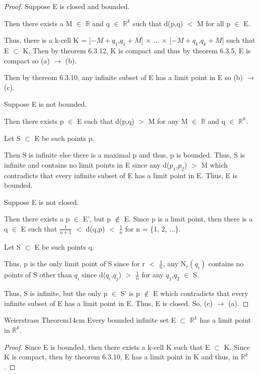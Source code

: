 	\begin{proof}
		Suppose E is closed and bounded.

		Then there exists a M $\in$ $\mathbb{R}$ and q $\in$ $\mathbb{R}^k$
		such that d(p,q) $<$ M for all p $\in$ E.
		
		Thus, there is a k-cell
		K = [$-M+q_1$,$q_1+M$] $\times$ ... $\times$ [$-M+q_k$,$q_k+M$]
		such that E $\subset$ K.
		Then by {\color{red} theorem 6.3.12}, K is compact
		and thus by {\color{red} theorem 6.3.5}, E is compact
		so (a) $\rightarrow$ (b).

		Then by {\color{red} thereom 6.3.10}, any infinite subset
		of E has a limit point in E so (b) $\rightarrow$ (c).

		Suppose E is not bounded.

		Then there exists p $\in$ E such that d(p,q) $>$ M for
		any M $\in$ $\mathbb{R}$ and q $\in$ $\mathbb{R}^k$.

		Let S $\subset$ E be such points p.
		
		Then S is infinite else there is a maximal p and thus,
		p is bounded.
		Thus, S is infinite and contains no limit points in E
		since any d($p_1$,$p_2$) $>$ M which contradicts that
		every infinite subset of E has a limit point in E.
		Thus, E is bounded.

		Suppose E is not closed.

		Then there exists a p $\in$ E', but p $\not \in$ E.
		Since p is a limit point, then there is a
		q $\in$ E such that $\frac{1}{n+1}$ $<$ d(q,p) $<$ $\frac{1}{n}$
		for n = \{1, 2, ...\}.

		Let S $\subset$ E be such points q.

		Thus, p is the only limit point of S since for r $<$ $\frac{1}{n}$,
		any N$_r(q_i)$ contains no points of S other than $q_i$ since
		d($q_i$,$q_j$) $>$ $\frac{1}{n}$ for any $q_1$,$q_2$ $\in$ S.
		
		Thus, S is infinite, but the only p $\in$ S' is p $\not \in$ E
		which contradicts that every infinite subset of E has a
		limit point in E. Thus, E is closed. So, (c) $\rightarrow$ (a).
	\end{proof}

	\vspace{0.5cm}



	\begin{wtheorem}{Weierstrass Theorem}{14cm}
		Every bounded infinite set E $\subset$ $\mathbb{R}^k$ has
		a limit point in $\mathbb{R}^k$.
	\end{wtheorem}
	
	\begin{proof}
		Since E is bounded, then there exists a k-cell K such that
		E $\subset$ K.
		Since K is compact, then by {\color{red} theorem 6.3.10},
		E has a limit point in K and thus, in $\mathbb{R}^k$.	
	\end{proof}




